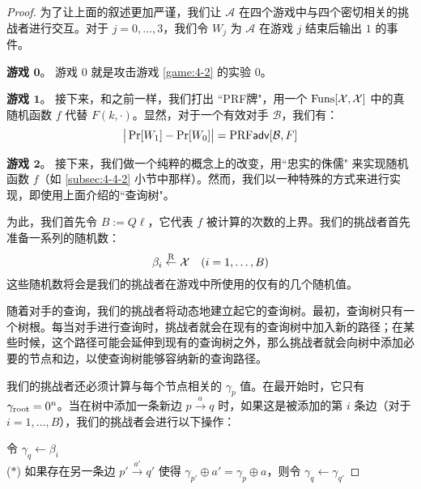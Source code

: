 \begin{proof}
为了让上面的叙述更加严谨，我们让 $\mathcal{A}$ 在四个游戏中与四个密切相关的挑战者进行交互。对于 $j=0,\dots,3$，我们令 $W_j$ 为 $\mathcal{A}$ 在游戏 $j$ 结束后输出 $1$ 的事件。

\vspace{5pt}

\textbf{游戏 $\mathbf{0}$}。
游戏 $0$ 就是攻击游戏 \ref{game:4-2} 的实验 $0$。

\vspace{5pt}

\textbf{游戏 $\mathbf{1}$}。
接下来，和之前一样，我们打出 ``PRF牌"，用一个 ${\rm Funs}[\mathcal{X},\mathcal{X}]$ 中的真随机函数 $f$ 代替 $F(k,\cdot)$。显然，对于一个有效对手 $\mathcal{B}$，我们有：
\begin{equation}\label{eq:6-9}
\big\lvert
\Pr[W_1]-\Pr[W_0]
\big\rvert
={\rm PRF}\mathsf{adv}[\mathcal{B},F]
\end{equation}

\textbf{游戏 $\mathbf{2}$}。
接下来，我们做一个纯粹的概念上的改变，用``忠实的侏儒" 来实现随机函数 $f$（如 \ref{subsec:4-4-2} 小节中那样）。然而，我们以一种特殊的方式来进行实现，即使用上面介绍的``查询树"。

为此，我们首先令 $B:=Q\ell$，它代表 $f$ 被计算的次数的上界。我们的挑战者首先准备一系列的随机数：
\[
\beta_i\overset{\rm R}\leftarrow\mathcal{X}\quad
(i=1,\dots,B)
\]
这些随机数将会是我们的挑战者在游戏中所使用的仅有的几个随机值。

随着对手的查询，我们的挑战者将动态地建立起它的查询树。最初，查询树只有一个树根。每当对手进行查询时，挑战者就会在现有的查询树中加入新的路径；在某些时候，这个路径可能会延伸到现有的查询树之外，那么挑战者就会向树中添加必要的节点和边，以使查询树能够容纳新的查询路径。

我们的挑战者还必须计算与每个节点相关的 $\gamma_p$ 值。在最开始时，它只有 $\gamma_{\rm root}=0^n$。当在树中添加一条新边 $p\overset{a}\rightarrow q$ 时，如果这是被添加的第 $i$ 条边（对于 $i=1,\dots,B$），我们的挑战者会进行以下操作：

\vspace{8pt}

\hspace*{5pt} 令 $\gamma_q\leftarrow\beta_i$\\
\hspace*{1pt} ($*$)
\hspace*{4.5pt} 如果存在另一条边 $p'\overset{a'}\rightarrow q'$ 使得 $\gamma_{p'}\oplus a'=\gamma_p\oplus a$，则令 $\gamma_q\leftarrow\gamma_{q'}$


\end{proof}

